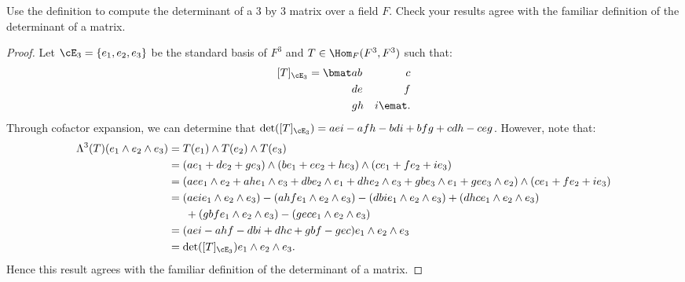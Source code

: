 \documentclass[10pt,twoside,openany]{memoir}
\begin{document}
    \begin{exercise}
       Use the definition to compute the determinant of a $3$ by $3$ matrix over a field $F$. Check your results agree with the familiar definition of the determinant of a matrix.
    \end{exercise}
        \begin{proof}
            Let $\cE_3 = \{e_1,e_2,e_3\}$ be the standard basis of $F^3$ and $T \in \Hom_F(F^3,F^3)$ such that:
                \begin{equation*}
                \begin{split}
                    [T]_{\cE_3} = \bmat a & b & c \\ d & e & f \\ g & h & i \emat.
                \end{split}
                \end{equation*}
            Through cofactor expansion, we can determine that $\det([T]_{\cE_3}) = aei - afh - bdi + bfg + cdh - ceg$. However, note that:
                \begin{equation*}
                \begin{split}
                    \Lambda^3(T)(e_1 \wedge e_2 \wedge e_3)
                    & = T(e_1) \wedge T(e_2) \wedge T(e_3) \\
                    & = (ae_1 + de_2 + ge_3)\wedge(be_1 + ee_2 + he_3)\wedge(ce_1 + fe_2 +ie_3) \\
                    & = (ae e_1\wedge e_2 + ah e_1 \wedge e_3 +db e_2 \wedge e_1 + dh e_2 \wedge e_3 + gb e_3 \wedge e_1 + gee_3 \wedge e_2)\wedge(ce_1 + fe_2 + ie_3) \\
                    & = (aeie_1 \wedge e_2 \wedge e_3) - (ahfe_1 \wedge e_2 \wedge e_3) - (dbie_1 \wedge e_2 \wedge e_3) + (dhc e_1 \wedge e_2 \wedge e_3) \\
                    &\phantom{==}+ (gbfe_1 \wedge e_2 \wedge e_3) - (gec e_1 \wedge e_2 \wedge e_3) \\
                    &= (aei-ahf-dbi+dhc+gbf-gec)e_1 \wedge e_2 \wedge e_3 \\
                    &= \det([T]_{\cE_3})e_1 \wedge e_2 \wedge e_3.
                \end{split}
                \end{equation*}
            Hence this result agrees with the familiar definition of the determinant of a matrix.
        \end{proof}
\end{document}
